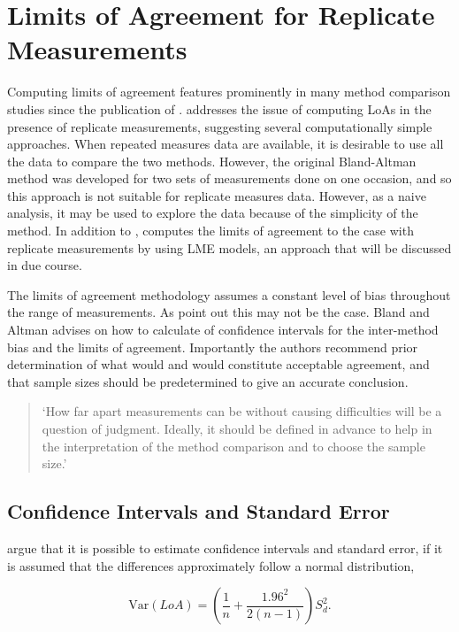 \documentclass[12pt, a4paper]{report}
\theoremstyle{plain}
\theoremstyle{definition}
\theoremstyle{remark}
\begin{document}
\section{Limits of Agreement for Replicate Measurements}

Computing limits of agreement features prominently in many method comparison studies since the publication of \citet{BA86}.
\citet{BA99} addresses the issue of computing LoAs in the presence of replicate measurements, suggesting several computationally simple approaches. When repeated measures data are available, it is desirable to use
all the data to compare the two methods. However, the original Bland-Altman method was developed for two sets of measurements done on one occasion, and so this approach is not suitable for replicate measures data. However, as a naive analysis, it may be used to explore the data because of the simplicity of the method.
In addition to \citet{BA99}, \citet{BXC2008} computes the limits of agreement to the case with replicate measurements by using LME models, an approach that will be discussed in due course.


The limits of agreement methodology assumes a constant level of
bias throughout the range of measurements. As \citet*{BA86} point
out this may not be the case. Bland and Altman advises on how to
calculate of confidence intervals for the inter-method bias and
the limits of agreement. Importantly the authors recommend prior
determination of what would and would constitute acceptable
agreement, and that sample sizes should be predetermined to give
an accurate conclusion.

\begin{quote}
	`How far apart measurements can be without causing difficulties
	will be a question of judgment. Ideally, it should be defined in
	advance to help in the interpretation of the method comparison and
	to choose the sample size.'\citep{BA86}
\end{quote}



\subsection{Confidence Intervals and Standard Error}
\citet*{BA99} argue that it is possible to estimate confidence
intervals and standard error, if it is assumed that the
differences approximately follow a normal distribution,

\begin{equation}
\mbox{Var}(LoA) = (\frac{1}{n}+\frac{1.96^{2}}{2(n-1)})S_{d}^{2}.
\end{equation}
\end{document}
